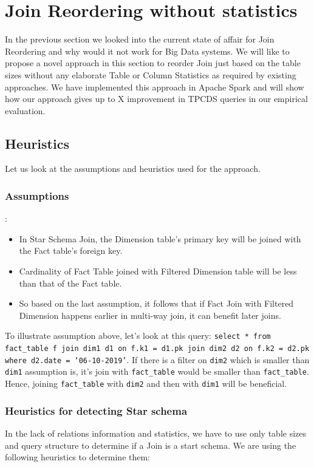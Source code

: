 \section{Join Reordering without statistics}\label{sec:jo}
In the previous section we looked into the current state of affair for Join Reordering and why would it not work for Big Data systems. We will like to propose a novel approach in this section to reorder Join just based on the table sizes without any elaborate Table or Column Statistics as required by existing approaches.
We have implemented this approach in Apache Spark and will show how our approach gives up to X improvement in TPCDS queries in our empirical evaluation.

\subsection{Heuristics}

Let us look at the assumptions and heuristics used for the approach.

\subsubsection{Assumptions}\label{subsubsec:assumption}:

\begin{itemize}
\item In Star Schema Join, the Dimension table’s primary key will be joined with the Fact table’s foreign key.
\item Cardinality of Fact Table joined with Filtered Dimension table will be less than that of the Fact table.
\item So based on the last assumption, it follows that if Fact Join with Filtered Dimension happens earlier in multi-way join, it can benefit later joins.
\end{itemize}

To illustrate assumption above, let's look at this query:
\texttt{select * from fact\_table f join dim1 d1 on f.k1 = d1.pk join dim2 d2 on f.k2 = d2.pk where d2.date = ‘06-10-2019’}. If there is a filter on \texttt{dim2} which is smaller than \texttt{dim1} assumption is, it’s join with \texttt{fact\_table} would be smaller than \texttt{fact\_table}. Hence, joining \texttt{fact\_table} with \texttt{dim2} and then with \texttt{dim1} will be beneficial.

\subsubsection{Heuristics for detecting Star schema}
In the lack of relations information and statistics, we have to use only table sizes and query structure to determine if a Join is a start schema. We are using the following heuristics to determine them:

